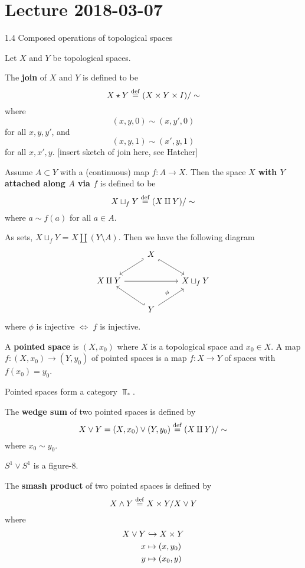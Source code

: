 \section{Lecture 2018-03-07}

1.4 Composed operations of topological spaces

Let $X$ and $Y$ be topological spaces.

\begin{defn}
	The \textbf{join} of $X$ and $Y$ is defined to be
	\[X \star Y \overset{\mathrm{def}}{=} (X \times Y \times I)/\sim\]
	where
	\[(x,y,0) \sim (x,y',0)\]
	for all $x,y,y'$, and
	\[(x,y,1) \sim (x',y,1)\]
	for all $x,x',y$.
	[insert sketch of join here, see Hatcher]
\end{defn}

\begin{defn}
	Assume $A \subset Y$ with a (continuous) map $f:A \to X$.
	Then the space \textbf{$X$ with $Y$ attached along $A$ via $f$} is defined to be
	\[X \sqcup_f Y \overset{\mathrm{def}}{=} (X \amalg Y)/\sim\]
	where $a \sim f(a)$ for all $a \in A$.
	
	As sets, $X \sqcup_f Y$ = $X \amalg (Y \setminus A)$.
	Then we have the following diagram
	\[
	\begin{tikzcd}
		& X \arrow[rd, hook'] \arrow[ld, hook'] &  \\
		X \amalg Y \arrow[rr] &  & X \sqcup_f Y \\
		& Y \arrow[ru, "\phi"] \arrow[lu, hook'] & 
	\end{tikzcd}
	\]
	where $\phi$ is injective $\iff$ $f$ is injective.
\end{defn}

\begin{defn}
	A \textbf{pointed space} is $(X,x_0)$ where $X$ is a topological space and $x_0 \in X$.
	A map $f:(X,x_0) \to (Y,y_0)$ of pointed spaces is a map $f:X \to Y$ of spaces with $f(x_0)=y_0$.
	
	Pointed spaces form a category $\Top_*$.
\end{defn}

\begin{defn}
	The \textbf{wedge sum} of two pointed spaces is defined by
	\[X \vee Y = (X,x_0) \vee (Y,y_0) \overset{\mathrm{def}}{=} (X \amalg Y)/\sim\]
	where $x_0 \sim y_0$.
\end{defn}

\begin{exam}
	$S^1 \vee S^1$ is a figure-8.
\end{exam}

\begin{defn}
	The \textbf{smash product} of two pointed spaces is defined by
	\[X \wedge Y \overset{\mathrm{def}}{=} X \times Y / X \vee Y\]
	where
	\begin{align*}
		X \vee Y &\hookrightarrow X \times Y \\
		x &\mapsto (x,y_0) \\
		y &\mapsto (x_0,y)
	\end{align*}
\end{defn}

